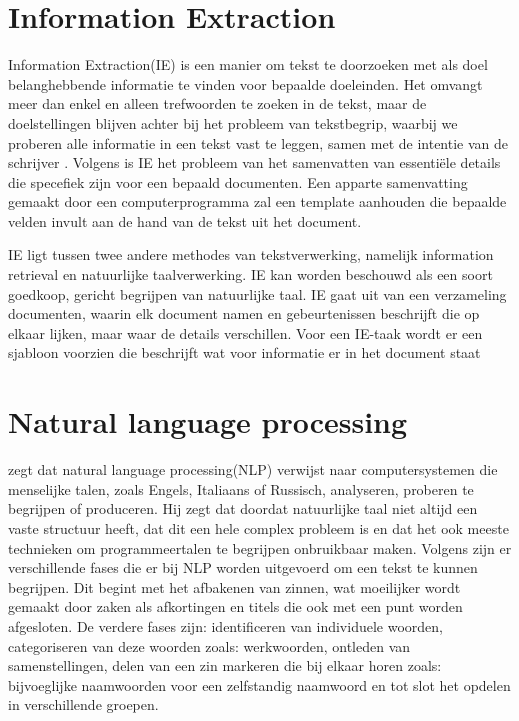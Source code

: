 \section{Information Extraction}

Information Extraction(IE) is een manier om tekst te doorzoeken met als doel belanghebbende informatie te vinden voor bepaalde doeleinden. Het omvangt meer dan enkel en alleen trefwoorden te zoeken in de tekst, maar de doelstellingen blijven achter bij het probleem van tekstbegrip, waarbij we proberen alle informatie in een tekst vast te leggen, samen met de intentie van de schrijver \autocite{hobbs2010}. Volgens \textcite{Freitag2000} is IE het probleem van het samenvatten van essentiële details die specefiek zijn voor een bepaald documenten. Een apparte samenvatting gemaakt door een computerprogramma zal een template aanhouden die bepaalde velden invult aan de hand van de tekst uit het document.

IE ligt tussen twee andere methodes van tekstverwerking, namelijk information retrieval en natuurlijke taalverwerking. IE kan worden beschouwd als een soort goedkoop, gericht begrijpen van natuurlijke taal. IE gaat uit van een verzameling documenten, waarin elk document namen en gebeurtenissen beschrijft die op elkaar lijken, maar waar de details verschillen. Voor een IE-taak wordt er een sjabloon voorzien die beschrijft wat voor informatie er in het document staat \autocite{Freitag2000}

\section{Natural language processing}

\textcite{allen2003natural} zegt dat natural language processing(NLP) verwijst naar computersystemen die menselijke talen, zoals Engels, Italiaans of Russisch, analyseren, proberen te begrijpen of produceren. Hij zegt dat doordat natuurlijke taal niet altijd een vaste structuur heeft, dat dit een hele complex probleem is en dat het ook meeste technieken om programmeertalen te begrijpen onbruikbaar maken. Volgens \textcite{Nadkarni2011} zijn er verschillende fases die er bij NLP worden uitgevoerd om een tekst te kunnen begrijpen. Dit begint met het afbakenen van zinnen, wat moeilijker wordt gemaakt door zaken als afkortingen en titels die ook met een punt worden afgesloten. De verdere fases zijn: identificeren van individuele woorden, categoriseren van deze woorden zoals: werkwoorden, ontleden van samenstellingen, delen van een zin markeren die bij elkaar horen zoals: bijvoeglijke naamwoorden voor een zelfstandig naamwoord en tot slot het opdelen in verschillende groepen.


